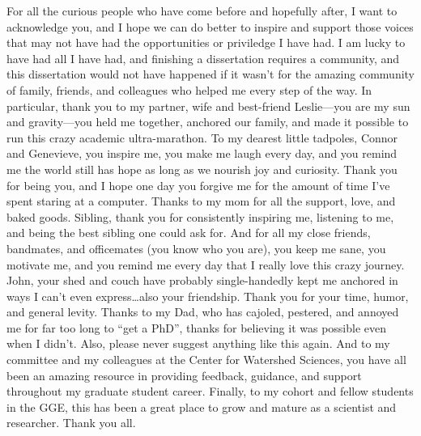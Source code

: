 \documentclass[twoside,12pt,final]{ucthesis-CA2012} %
\begin{document}
\begin{ucfrontmatter}
\begin{dedication}
\begin{center}
\begin{Large}
      \end{Large}
      \end{center}
  \end{dedication}
  \begin{acknowledgements}
    For all the curious people who have come before and hopefully after, I
    want to acknowledge you, and I hope we can do better to inspire and
    support those voices that may not have had the opportunities or
    priviledge I have had. I am lucky to have had all I have had, and
    finishing a dissertation requires a community, and this dissertation
    would not have happened if it wasn't for the amazing community of
    family, friends, and colleagues who helped me every step of the way. In
    particular, thank you to my partner, wife and best-friend Leslie---you
    are my sun and gravity---you held me together, anchored our family, and
    made it possible to run this crazy academic ultra-marathon. To my
    dearest little tadpoles, Connor and Genevieve, you inspire me, you make
    me laugh every day, and you remind me the world still has hope as long
    as we nourish joy and curiosity. Thank you for being you, and I hope one
    day you forgive me for the amount of time I've spent staring at a
    computer. Thanks to my mom for all the support, love, and baked goods.
    Sibling, thank you for consistently inspiring me, listening to me, and
    being the best sibling one could ask for. And for all my close friends,
    bandmates, and officemates (you know who you are), you keep me sane, you
    motivate me, and you remind me every day that I really love this crazy
    journey. John, your shed and couch have probably single-handedly kept me
    anchored in ways I can't even express\ldots{}also your friendship. Thank
    you for your time, humor, and general levity. Thanks to my Dad, who has
    cajoled, pestered, and annoyed me for far too long to ``get a PhD'',
    thanks for believing it was possible even when I didn't. Also, please
    never suggest anything like this again. And to my committee and my
    colleagues at the Center for Watershed Sciences, you have all been an
    amazing resource in providing feedback, guidance, and support throughout
    my graduate student career. Finally, to my cohort and fellow students in
    the GGE, this has been a great place to grow and mature as a scientist
    and researcher. Thank you all.
  \end{acknowledgements}


\end{ucfrontmatter}
\end{document}
